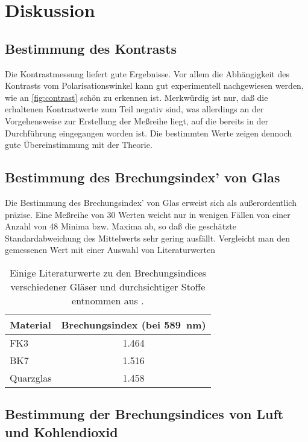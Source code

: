 
\section{Diskussion}

\subsection{Bestimmung des Kontrasts}

Die Kontrastmessung liefert gute Ergebnisse.  Vor allem die Abhängigkeit
des Kontrasts vom Polarisationswinkel kann gut experimentell
nachgewiesen werden, wie an \cref{fig:contrast} schön zu erkennen ist.
Merkwürdig ist nur, daß die erhaltenen Kontrastwerte zum Teil negativ
sind, was allerdings an der Vorgehensweise zur Erstellung der Meßreihe
liegt, auf die bereits in der Durchführung eingegangen worden ist.  Die
bestimmten Werte zeigen dennoch gute Übereinstimmung mit der Theorie.

\subsection{Bestimmung des Brechungsindex' von Glas}

Die Bestimmung des Brechungsindex' von Glas erweist sich als
außerordentlich präzise.  Eine Meßreihe von 30 Werten weicht nur in
wenigen Fällen von einer Anzahl von 48 Minima bzw. Maxima ab, so daß
die geschätzte Standardabweichung des Mittelwerts sehr gering ausfällt.
Vergleicht man den gemessenen Wert mit einer Auswahl von Literaturwerten

\begin{table}
  \centering
  \begin{tabular}{lS}
    \toprule
    Material & Brechungsindex (bei \SI{589}{nm}) \\
    \midrule
    FK3 & 1.464 \\
    BK7 & 1.516 \\
    Quarzglas & 1.458 \\
    \bottomrule
  \end{tabular}
  \caption{Einige Literaturwerte zu den Brechungsindices verschiedener
    Gläser und durchsichtiger Stoffe entnommen aus
    \textcite[][223]{demtröder-2}.}
  \label{tab:lit_ref_index_glass}
\end{table}

\subsection{Bestimmung der Brechungsindices von Luft und Kohlendioxid}
